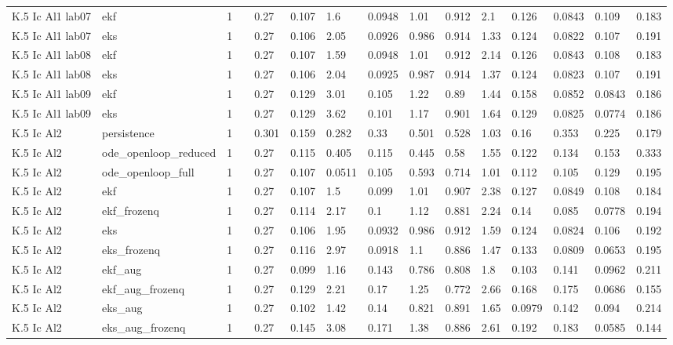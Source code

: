 \begin{table}[t]
\begin{tabular}{lllllllllllllll}
K.5 Ic Al1 lab07 & ekf & 1 &  & 0.27 & 0.107 & 1.6 & 0.0948 & 1.01 & 0.912 & 2.1 & 0.126 & 0.0843 & 0.109 & 0.183 \\
K.5 Ic Al1 lab07 & eks & 1 &  & 0.27 & 0.106 & 2.05 & 0.0926 & 0.986 & 0.914 & 1.33 & 0.124 & 0.0822 & 0.107 & 0.191 \\
K.5 Ic Al1 lab08 & ekf & 1 &  & 0.27 & 0.107 & 1.59 & 0.0948 & 1.01 & 0.912 & 2.14 & 0.126 & 0.0843 & 0.108 & 0.183 \\
K.5 Ic Al1 lab08 & eks & 1 &  & 0.27 & 0.106 & 2.04 & 0.0925 & 0.987 & 0.914 & 1.37 & 0.124 & 0.0823 & 0.107 & 0.191 \\
K.5 Ic Al1 lab09 & ekf & 1 &  & 0.27 & 0.129 & 3.01 & 0.105 & 1.22 & 0.89 & 1.44 & 0.158 & 0.0852 & 0.0843 & 0.186 \\
K.5 Ic Al1 lab09 & eks & 1 &  & 0.27 & 0.129 & 3.62 & 0.101 & 1.17 & 0.901 & 1.64 & 0.129 & 0.0825 & 0.0774 & 0.186 \\
K.5 Ic Al2 & persistence & 1 &  & 0.301 & 0.159 & 0.282 & 0.33 & 0.501 & 0.528 & 1.03 & 0.16 & 0.353 & 0.225 & 0.179 \\
K.5 Ic Al2 & ode\_openloop\_reduced & 1 &  & 0.27 & 0.115 & 0.405 & 0.115 & 0.445 & 0.58 & 1.55 & 0.122 & 0.134 & 0.153 & 0.333 \\
K.5 Ic Al2 & ode\_openloop\_full & 1 &  & 0.27 & 0.107 & 0.0511 & 0.105 & 0.593 & 0.714 & 1.01 & 0.112 & 0.105 & 0.129 & 0.195 \\
K.5 Ic Al2 & ekf & 1 &  & 0.27 & 0.107 & 1.5 & 0.099 & 1.01 & 0.907 & 2.38 & 0.127 & 0.0849 & 0.108 & 0.184 \\
K.5 Ic Al2 & ekf\_frozenq & 1 &  & 0.27 & 0.114 & 2.17 & 0.1 & 1.12 & 0.881 & 2.24 & 0.14 & 0.085 & 0.0778 & 0.194 \\
K.5 Ic Al2 & eks & 1 &  & 0.27 & 0.106 & 1.95 & 0.0932 & 0.986 & 0.912 & 1.59 & 0.124 & 0.0824 & 0.106 & 0.192 \\
K.5 Ic Al2 & eks\_frozenq & 1 &  & 0.27 & 0.116 & 2.97 & 0.0918 & 1.1 & 0.886 & 1.47 & 0.133 & 0.0809 & 0.0653 & 0.195 \\
K.5 Ic Al2 & ekf\_aug & 1 &  & 0.27 & 0.099 & 1.16 & 0.143 & 0.786 & 0.808 & 1.8 & 0.103 & 0.141 & 0.0962 & 0.211 \\
K.5 Ic Al2 & ekf\_aug\_frozenq & 1 &  & 0.27 & 0.129 & 2.21 & 0.17 & 1.25 & 0.772 & 2.66 & 0.168 & 0.175 & 0.0686 & 0.155 \\
K.5 Ic Al2 & eks\_aug & 1 &  & 0.27 & 0.102 & 1.42 & 0.14 & 0.821 & 0.891 & 1.65 & 0.0979 & 0.142 & 0.094 & 0.214 \\
K.5 Ic Al2 & eks\_aug\_frozenq & 1 &  & 0.27 & 0.145 & 3.08 & 0.171 & 1.38 & 0.886 & 2.61 & 0.192 & 0.183 & 0.0585 & 0.144 \\

\end{tabular}
\end{table}
